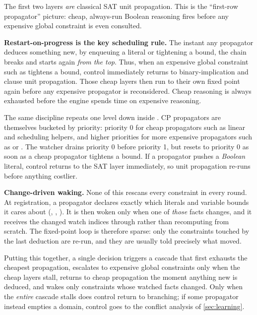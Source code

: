 The first two layers \emph{are} classical SAT unit propagation. This is the
``first-row propagator'' picture: cheap, always-run Boolean reasoning fires
before any expensive global constraint is even consulted.

\textbf{Restart-on-progress is the key scheduling rule.} The instant any
propagator deduces something new, by enqueuing a literal or tightening a bound,
the chain breaks and starts again \emph{from the top}. Thus, when an expensive
global constraint such as  tightens a bound,
control immediately returns to binary-implication and clause unit propagation.
Those cheap layers then run to their own fixed point again before any expensive
propagator is reconsidered. Cheap reasoning is always exhausted before the
engine spends time on expensive reasoning.

The same discipline repeats one level down inside
. CP propagators are themselves
bucketed by priority: priority 0 for cheap propagators such as linear and
scheduling helpers, and higher priorities for more expensive propagators such as
 or
. The watcher drains priority 0 before
priority 1, but resets to priority 0 as soon as a cheap propagator tightens a
bound. If a propagator pushes a \emph{Boolean} literal, control returns to the
SAT layer immediately, so unit propagation re-runs before anything costlier.

\textbf{Change-driven waking.} None of this rescans every constraint in every
round. At registration, a propagator declares exactly which literals and
variable bounds it cares about (, ,
). It is then woken only when one of \emph{those} facts
changes, and it receives the changed watch indices through
 rather than recomputing from scratch. The fixed-point
loop is therefore sparse: only the constraints touched by the last deduction are
re-run, and they are usually told precisely what moved.

Putting this together, a single decision triggers a cascade that first exhausts
the cheapest propagation, escalates to expensive global constraints only when
the cheap layers stall, returns to cheap propagation the moment anything new is
deduced, and wakes only constraints whose watched facts changed. Only when the
\emph{entire} cascade stalls does control return to branching; if some
propagator instead empties a domain, control goes to the conflict analysis of
\cref{sec:learning}.

